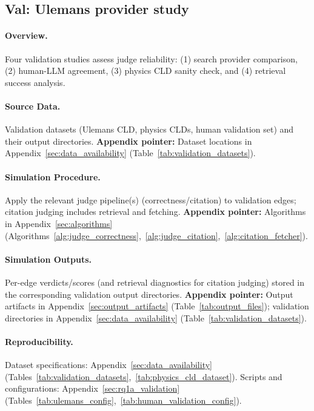 \subsection{Val: Ulemans provider study}
\label{sec:rq1a_validation_studies}

\paragraph{Overview.}
Four validation studies assess judge reliability: (1) search provider comparison, (2) human-LLM agreement, (3) physics CLD sanity check, and (4) retrieval success analysis.

\paragraph{Source Data.}
Validation datasets (Ulemans CLD, physics CLDs, human validation set) and their output directories.
\textbf{Appendix pointer:} Dataset locations in Appendix~\ref{sec:data_availability} (Table~\ref{tab:validation_datasets}).

\paragraph{Simulation Procedure.}
Apply the relevant judge pipeline(s) (correctness/citation) to validation edges; citation judging includes retrieval and fetching.
\textbf{Appendix pointer:} Algorithms in Appendix~\ref{sec:algorithms} (Algorithms~\ref{alg:judge_correctness},~\ref{alg:judge_citation},~\ref{alg:citation_fetcher}).

\paragraph{Simulation Outputs.}
Per-edge verdicts/scores (and retrieval diagnostics for citation judging) stored in the corresponding validation output directories.
\textbf{Appendix pointer:} Output artifacts in Appendix~\ref{sec:output_artifacts} (Table~\ref{tab:output_files}); validation directories in Appendix~\ref{sec:data_availability} (Table~\ref{tab:validation_datasets}).

\paragraph{Reproducibility.}
Dataset specifications: Appendix~\ref{sec:data_availability} (Tables~\ref{tab:validation_datasets},~\ref{tab:physics_cld_dataset}). Scripts and configurations: Appendix~\ref{sec:rq1a_validation} (Tables~\ref{tab:ulemans_config},~\ref{tab:human_validation_config}).

